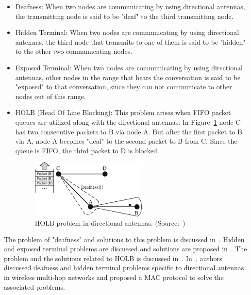 \documentclass[12pt, oneandhalf, chaparabic, sees, ms]{metu}
\begin{document}
\vspace{-0.3cm}
\begin{itemize}
\setlength\itemsep{0em}
\item Deafness: When two nodes are communicating by using directional antennas, the transmitting node is said to be "deaf" to the third transmitting node.
\item Hidden Terminal: When two nodes are communicating by using directional antennas, the third node that transmits to one of them is said to be "hidden" to the other two communicating nodes.
\item Exposed Terminal: When two nodes are communicating by using directional antennas, other nodes in the range that hears the conversation is said to be "exposed" to that conversation,
since they can not communicate to other nodes out of this range.
\item HOLB (Head Of Line Blocking): This problem arises when FIFO packet queues are utilized along with the directional antennas.
In Figure~\ref{fig:holb} node C has two consecutive packets to B via node A.
But after the first packet to B via A, node A becomes "deaf" to the second packet to B from C. Since the queue is FIFO, the third packet to D  is blocked.
\vspace{-0.25cm}
% 
%
%
\begin{figure}[!htbp]
 \begin{center}
  \includegraphics[width=0.55\textwidth]{holb.png}
 \end{center}
 \caption{HOLB problem in directional antennas. (Source:~\protect\cite{dai2011})}
  \label{fig:holb}
\end{figure}
\end{itemize}


\newpage
The problem of "deafness" and solutions to this problem is discussed in~\cite{gossain2004}. Hidden and exposed terminal problems
are discussed and solutions are proposed in~\cite{sekido2005, adere2010, reddy2012}. The problem and the solutions related to HOLB is discussed in~\cite{kolar2004-2}.
In~\cite{subramanian2007, subramanian2010}, authors discussed deafness and hidden terminal problems specific to directional antennas in wireless multi-hop networks and 
proposed a MAC protocol to solve the associated problems.
\end{document}
